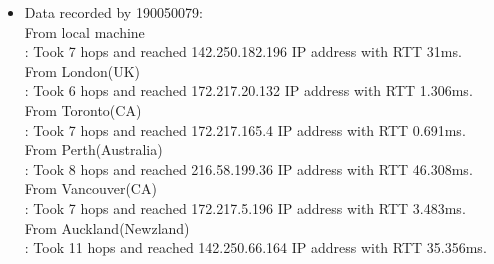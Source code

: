 \documentclass[12pt]{article}
\theoremstyle{remark}
\begin{document}
\begin{itemize}
\item Data recorded by 190050079:\\
From local machine    \\
: Took 7 hops and reached 142.250.182.196 IP address with RTT 31ms.\\
From London(UK)    \\
: Took 6 hops and reached 172.217.20.132 IP address with RTT 1.306ms.\\
From Toronto(CA)  \\
: Took 7 hops and reached 172.217.165.4 IP address with RTT 0.691ms.\\
From Perth(Australia)   \\
: Took 8 hops and reached 216.58.199.36 IP address with RTT 46.308ms.\\
From Vancouver(CA)    \\
: Took 7 hops and reached  172.217.5.196 IP address with RTT 3.483ms.\\
From Auckland(Newzland)\\
: Took 11 hops and reached 142.250.66.164 IP address with RTT 35.356ms.\\ 
\end{itemize}
\end{document}
